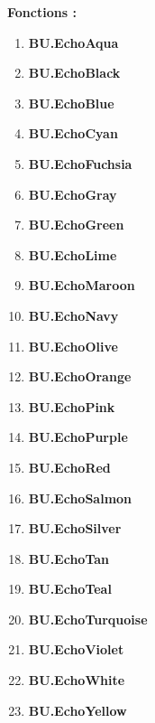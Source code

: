 \documentclass[a4paper,10pt]{article}
\begin{document}
\begin{justify}
    \textbf{Fonctions :}
    \begin{enumerate}
        \item \textbf{\color{Aqua}BU.EchoAqua}\setlength{\parskip}{0em}
        \item \textbf{\color{text}BU.EchoBlack}
        \item \textbf{\color{Blue}BU.EchoBlue}

        \setlength{\parskip}{1em}

        \item \textbf{\color{Cyan}BU.EchoCyan}\setlength{\parskip}{0em}
        \item \textbf{\color{Fuchsia}BU.EchoFuchsia}
        \item \textbf{\color{Gray}BU.EchoGray}

        \setlength{\parskip}{1em}

        \item \textbf{\color{Green}BU.EchoGreen}\setlength{\parskip}{0em}
        \item \textbf{\color{Lime}BU.EchoLime}
        \item \textbf{\color{Maroon}BU.EchoMaroon}

        \setlength{\parskip}{1em}

        \item \textbf{\color{Navy}BU.EchoNavy}\setlength{\parskip}{0em}
        \item \textbf{\color{Olive}BU.EchoOlive}
        \item \textbf{\color{Orange}BU.EchoOrange}

        \setlength{\parskip}{1em}

        \item \textbf{\color{Pink}BU.EchoPink}\setlength{\parskip}{0em}
        \item \textbf{\color{Purple}BU.EchoPurple}
        \item \textbf{\color{Red}BU.EchoRed}

        \setlength{\parskip}{1em}

        \item \textbf{\color{Salmon}BU.EchoSalmon}\setlength{\parskip}{0em}
        \item \textbf{\color{Silver}BU.EchoSilver}
        \item \textbf{\color{Tan}BU.EchoTan}

        \setlength{\parskip}{1em}

        \item \textbf{\color{Teal}BU.EchoTeal}\setlength{\parskip}{0em}
        \item \textbf{\color{Turquoise}BU.EchoTurquoise}
        \item \textbf{\color{Violet}BU.EchoViolet}

        \setlength{\parskip}{1em}

        \item \textbf{\color{text}BU.EchoWhite}\setlength{\parskip}{0em}
        \item \textbf{\color{Yellow}BU.EchoYellow}
    \end{enumerate}
\end{justify}
\end{document}
